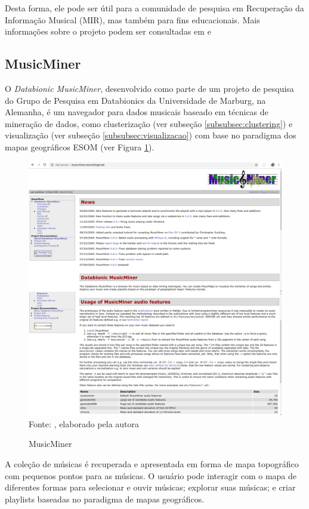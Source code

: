 Desta forma, ele pode ser útil para a comunidade de pesquisa em Recuperação da Informação Musical (MIR), mas também para fins educacionais. Mais informações sobre o projeto podem ser consultadas em \cite{lartillot2007, lartillot2013} e \cite{mirtoolbox}


\subsection{MusicMiner} \label{subsec:musicminer}
O \textit{Databionic MusicMiner}, desenvolvido como parte de um projeto de pesquisa do Grupo de Pesquisa em Databionics da Universidade de Marburg, na Alemanha, é um navegador para dados musicais baseado em técnicas de mineração de dados, como clusterização (ver subseção \ref{subsubsec:clustering}) e visualização (ver subseção \ref{subsubsec:visualizacao}) com base no paradigma dos mapas geográficos ESOM  (ver Figura \ref{fig:musicminer}).

\begin{figure}[!htb]
   \centering
   \caption{MusicMiner}\label{fig:musicminer} 
   \includegraphics[scale=0.25]{figuras/musicminer.png}
   \\Fonte: \cite{musicminer}, elaborado pela autora
\end{figure}

A coleção de músicas é recuperada e apresentada em forma de mapa topográfico com pequenos pontos para as músicas. O usuário pode interagir com o mapa de diferentes formas para selecionar e ouvir músicas; explorar suas músicas; e criar playlists baseadas no paradigma de mapas geográficos.

